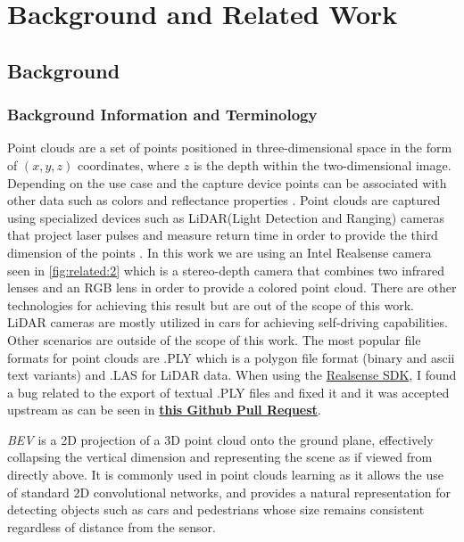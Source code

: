 %
\chapter{Background and Related Work}
\label{sec:related}


\section{Background}

\label{sec:related:sec1}


\subsection{Background Information and Terminology}
\par Point clouds are a set of points positioned in three-dimensional space in the form of $(x,y,z)$ coordinates, where $z$ is the depth within the two-dimensional image.
Depending on the use case and the capture device points can be associated with other data such as colors and reflectance properties \cite{Point}.
Point clouds are captured using specialized devices such as LiDAR(Light Detection and Ranging) cameras that project laser pulses and measure return time in order to provide the third dimension of the points \cite{Lidar_2026}.
In this work we are using an Intel Realsense camera seen in \ref{fig:related:2} which is a stereo-depth camera that combines two infrared lenses and an RGB lens in order to provide a colored point cloud.
There are other technologies for achieving this result but are out of the scope of this work. LiDAR cameras are mostly utilized in cars for achieving self-driving capabilities.
Other scenarios are outside of the scope of this work.
The most popular file formats for point clouds are .PLY which is a polygon file format (binary and ascii text variants) and .LAS for LiDAR data.
When using the \href{https://github.com/realsenseai/librealsense}{Realsense SDK}, I found a bug related to the export of textual .PLY files and fixed it and it was accepted upstream as can be seen in \href{https://github.com/realsenseai/librealsense/pull/14711}{\textbf{this Github Pull Request}}.

\emph{\ac{BEV}} is a 2D projection of a 3D point cloud onto the ground plane, effectively collapsing the vertical dimension and representing the scene as if viewed from directly above.
It is commonly used in point clouds learning as it allows the use of standard 2D convolutional networks, and provides a natural representation for detecting objects such as cars and pedestrians whose size remains consistent regardless of distance from the sensor.

